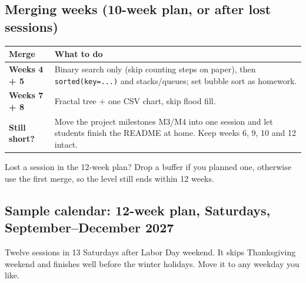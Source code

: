 \documentclass[level=3,teacher]{kidscode}
\begin{document}
\subsection{Merging weeks (10-week plan, or after lost sessions)}
\begin{tabularx}{\linewidth}{@{}>{\bfseries}p{2.5cm}X@{}}
\toprule
\rowcolor{kcaccent!15} Merge & What to do\\ \midrule
Weeks 4 + 5 & Binary search only (skip counting steps on paper), then \texttt{sorted(key=...)} and
stacks/queues; set bubble sort as homework.\\
Weeks 7 + 8 & Fractal tree + one CSV chart, skip flood fill.\\
Still short? & Move the project milestones M3/M4 into one session and let students finish the README
at home. Keep weeks 6, 9, 10 and 12 intact.\\
\bottomrule
\end{tabularx}

\par\smallskip
Lost a session in the 12-week plan? Drop a buffer if you planned one, otherwise use the first merge, so
the level still ends within 12 weeks.

\subsection{Sample calendar: 12-week plan, Saturdays, September--December 2027}
Twelve sessions in 13 Saturdays after Labor Day weekend. It skips Thanksgiving weekend and finishes
well before the winter holidays. Move it to any weekday you like.
\end{document}
